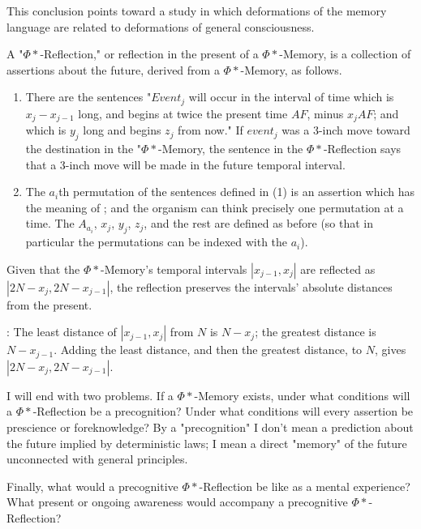 This conclusion points toward a study in which deformations of the 
memory language are related to deformations of general consciousness. 

 A "$\Phi*$-Reflection," or reflection in the present of a 
$\Phi*$-Memory, is a collection of assertions about the future, derived from a 
$\Phi*$-Memory, as follows. 
\begin{enumerate}
	\item There are the sentences "$Event_j$ will occur in the 
interval of time which is $x_j-x_{j-1}$ long, and begins at twice the present time 
$AF$, minus $x_j AF$; and which is $y_j$ long and begins $z_j$ from now." If $event_j$ was 
a 3-inch move toward the destination in the "$\Phi*$-Memory, the sentence in the 
$\Phi*$-Reflection says that a 3-inch move will be made in the future temporal 
interval. 
	\item The $a_i$th permutation of the sentences defined in (1) is an 
assertion which has the meaning of ; and the organism can 
think precisely one permutation at a time. The $A_{a_i}$, $x_j$, $y_j$, $z_j$, and the rest are 
defined as before (so that in particular the permutations can be indexed with 
the $a_i$). 
\end{enumerate}

 Given that the $\Phi*$-Memory's temporal intervals $|x_{j-1}, x_j|$
are reflected as $|2N-x_j, 2N-x_{j-1}|$, the reflection preserves the intervals' 
absolute distances from the present. 

\proof: The least distance of $|x_{j-1}, x_j|$
from $N$ is $N-x_j$; the greatest distance is $N-x_{j-1}$. Adding the least distance, and 
then the greatest distance, to $N$, gives $|2N-x_j, 2N-x_{j-1}|$.

I will end with two problems. If a $\Phi*$-Memory exists, under what 
conditions will a $\Phi*$-Reflection be a precognition? Under what conditions 
will every assertion be prescience or foreknowledge? By a "precognition" I 
don't mean a prediction about the future implied by deterministic laws; I 
mean a direct "memory" of the future unconnected with general principles. 

Finally, what would a precognitive $\Phi*$-Reflection be like as a mental 
experience? What present or ongoing awareness would accompany a 
precognitive $\Phi*$-Reflection? 

